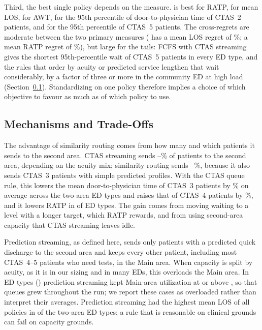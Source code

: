 Third, the best single policy depends on the measure. \OsfaRatpPolicy{} is best for RATP, \OsfaLosAllMeanPolicy{} for mean LOS, \OsfaAwtPolicy{} for AWT, \OsfaPiaCtastwoPninefivePolicy{} for the 95th percentile of door-to-physician time of CTAS~2 patients, and \OsfaPiaCtasfivePninefivePolicy{} for the 95th percentile of CTAS~5 patients. The cross-regrets are moderate between the two primary measures (\OsfaRatpPolicy{} has a mean LOS regret of \CrossRatpOnLosAllMean\%; \OsfaLosAllMeanPolicy{} a mean RATP regret of \CrossLosAllMeanOnRatp\%), but large for the tails: FCFS with CTAS streaming gives the shortest 95th-percentile wait of CTAS~5 patients in every ED type, and the rules that order by acuity or predicted service lengthen that wait considerably, by a factor of three or more in the community ED at high load (Section~\ref{sec:res:mech}). Standardizing on one policy therefore implies a choice of which objective to favour as much as of which policy to use.

\subsection{Mechanisms and Trade-Offs}
\label{sec:res:mech}

The advantage of similarity routing comes from how many and which patients it sends to the second area. CTAS streaming sends \ShareSecondStreamCtasMin--\ShareSecondStreamCtasMax\% of patients to the second area, depending on the acuity mix; similarity routing sends \ShareSecondStreamSimMin--\ShareSecondStreamSimMax\%, because it also sends CTAS~3 patients with simple predicted profiles. With the CTAS queue rule, this lowers the mean door-to-physician time of CTAS~3 patients by \SimVsCtasRouteCtasThreeWait\% on average across the two-area ED types and raises that of CTAS~4 patients by \SimVsCtasRouteCtasFourWait\%, and it lowers RATP in \SimVsCtasRouteNBetterRatp{} of \NTwoAreaTypes{} ED types. The gain comes from moving waiting to a level with a longer target, which RATP rewards, and from using second-area capacity that CTAS streaming leaves idle.

Prediction streaming, as defined here, sends only patients with a predicted quick discharge to the second area and keeps every other patient, including most CTAS~4--5 patients who need tests, in the Main area. When capacity is split by acuity, as it is in our sizing and in many EDs, this overloads the Main area. In \NOverloadedTypes{} ED types (\OverloadedTypesList) prediction streaming kept Main-area utilization at or above \OverloadThreshold, so that queues grew throughout the run; we report these cases as overloaded rather than interpret their averages. Prediction streaming had the highest mean LOS of all policies in \NWorstLosPredStream{} of the \NTwoAreaTypes{} two-area ED types; a rule that is reasonable on clinical grounds can fail on capacity grounds.

